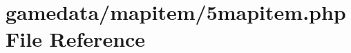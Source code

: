 \hypertarget{5mapitem_8php}{\section{gamedata/mapitem/5mapitem.php File Reference}
\label{5mapitem_8php}
}
